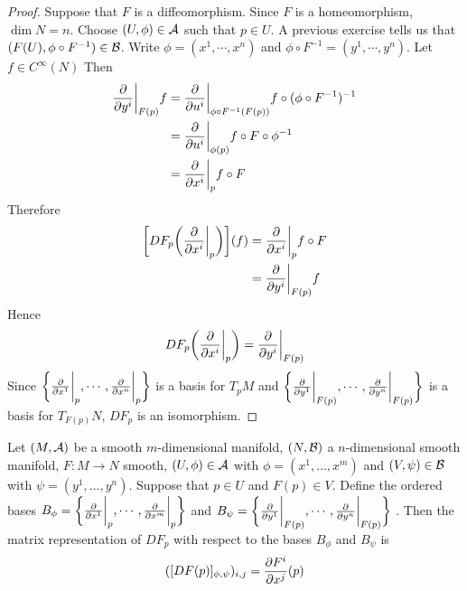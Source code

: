\documentclass{book}
\begin{document}
	\begin{proof}
		Suppose that $F$ is a diffeomorphism. Since $F$ is a homeomorphism, $\dim N = n$. Choose $(U, \phi) \in \mathcal{A}$ such that $p \in U$. A previous exercise tells us that $(F(U), \phi \circ F^{-1}) \in \mathcal{B}$. Write $\phi = (x^1, \cdots, x^n)$ and $\phi \circ F^{-1} = (y^1, \cdots, y^n)$. Let $f \in C^{\infty}(N)$ Then 
		\begin{align*}
			\frac{\partial}{\partial y^i} \bigg|_{F(p)} f
			&= 	\frac{\partial}{\partial u^i} \bigg|_{\phi \circ F^{-1} (F(p))} f \circ (\phi \circ F^{-1})^{-1} \\
			&= 	\frac{\partial}{\partial u^i} \bigg|_{\phi(p)} f \circ F \circ \phi^{-1} \\
			&= 	\frac{\partial}{\partial x^i} \bigg|_p f \circ F \\
		\end{align*}
		Therefore 
		\begin{align*}
			\bigg[ DF_p \bigg( \frac{\partial}{\partial x^i} \bigg|_p \bigg) \bigg] (f)
			&= \frac{\partial}{\partial x^i} \bigg|_p f \circ F \\
			&= \frac{\partial}{\partial y^i} \bigg|_{F(p)} f 
		\end{align*}
	Hence $$DF_p \bigg( \frac{\partial}{\partial x^i} \bigg|_p \bigg) = \frac{\partial}{\partial y^i} \bigg|_{F(p)}$$ 
	Since $\bigg \{\frac{\partial}{\partial x^1} \bigg|_p, \cdots, \frac{\partial}{\partial x^n} \bigg|_p \bigg \}$ is a basis for $T_pM$ and $\bigg \{\frac{\partial}{\partial y^1} \bigg|_{F(p)}, \cdots, \frac{\partial}{\partial y^n} \bigg|_{F(p)} \bigg \}$ is a basis for $T_{F(p)}N$, $DF_p$ is an isomorphism.
	\end{proof}

	\begin{ex}
		Let $(M, \mathcal{A})$ be a smooth $m$-dimensional manifold, $(N, \mathcal{B})$ a $n$-dimensional smooth manifold, $F: M \rightarrow N$ smooth, $(U, \phi) \in \mathcal{A}$ with $\phi = (x^1, \dots, x^m)$ and $(V, \psi) \in \mathcal{B}$ with $\psi = (y^1, \dots, y^n)$. Suppose that $p \in U$ and $F(p) \in V$. Define the ordered bases $B_\phi = \bigg \{\frac{\partial}{\partial x^1} \bigg|_p, \cdots, \frac{\partial}{\partial x^m} \bigg|_p \bigg \}$ and $B_{\psi} = \bigg \{\frac{\partial}{\partial y^1} \bigg|_{F(p)}, \cdots, \frac{\partial}{\partial y^n} \bigg|_{F(p)} \bigg \}$ .
		Then the matrix representation of $DF_p$ with respect to the bases
		$B_{\phi}$ and $B_{\psi}$ is $$ ([DF(p)]_{\phi, \psi})_{i,j} =  \frac{\partial F^i}{\partial x^j}(p)$$
	\end{ex}
\end{document}
